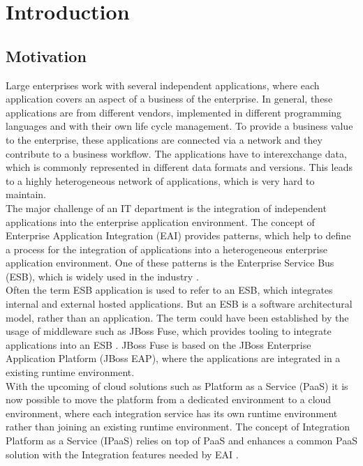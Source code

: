 \chapter{Introduction}
\label{cha:intro}

\section{Motivation}
\label{sec:intro-motivation}
Large enterprises work with several independent applications, where each application covers an aspect of a business of the enterprise. In general, these applications are from different vendors, implemented in different programming languages and with their own life cycle management. To provide a business value to the enterprise, these applications are connected via a network and they contribute to a business workflow. The applications have to interexchange data, which is commonly represented in different data formats and versions. This leads to a highly heterogeneous network of applications, which is very hard to maintain. \\

The major challenge of an IT department is the integration of independent applications into the enterprise application environment. The concept of Enterprise Application Integration (EAI) provides patterns, which help to define a process for the integration of applications into a heterogeneous enterprise application environment. One of these patterns is the Enterprise Service Bus (ESB), which is widely used in the industry \cite{EIP}. \\

Often the term ESB application is used to refer to an ESB, which integrates internal and external hosted applications. But an ESB is a software architectural model, rather than an application. The term could have been established by the usage of middleware such as JBoss Fuse, which provides tooling to integrate applications into an ESB \cite{Fuse2018}. JBoss Fuse is based on the JBoss Enterprise Application Platform (JBoss EAP), where the applications are integrated in a existing runtime environment. \\

With the upcoming of cloud solutions such as Platform as a Service (PaaS) it is now possible to move the platform from a dedicated environment to a cloud environment, where each integration service has its own runtime environment rather than joining an existing runtime environment. The concept of Integration Platform as a Service (IPaaS) relies on top of PaaS and enhances a common PaaS solution with the Integration features needed by EAI \cite{PaaS2015, iPaaSP12015}. \\
   
